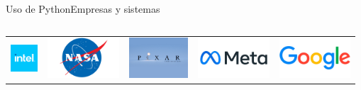 \documentclass[aspectratio=169,10pt]{beamer}
\begin{document}
\begin{frame}{Uso de Python}{Empresas y sistemas}
\begin{columns}
  \end{columns}

  \begin{table}[]
    \centering
    \begin{tabular}{@{}ccccc@{}}
      \includegraphics[height=1cm]{intel.png} & \includegraphics[height=1.5cm]{nasa.png} & \includegraphics[height=1.5cm]{pixar.jpg} & \includegraphics[height=1.5cm]{meta.jpg} & \includegraphics[height=1.5cm]{google.png}
    \end{tabular}
  \end{table}

\end{frame}
\end{document}
